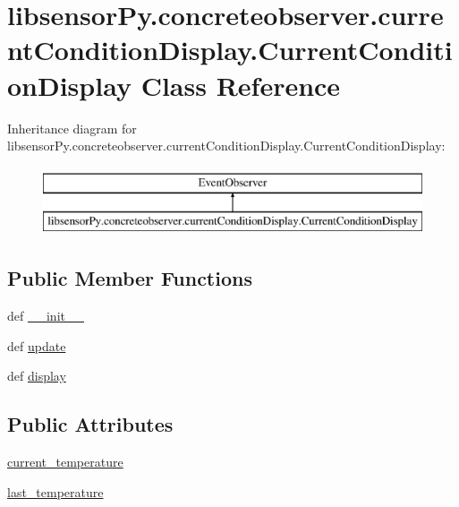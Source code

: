 \hypertarget{classlibsensorPy_1_1concreteobserver_1_1currentConditionDisplay_1_1CurrentConditionDisplay}{}\section{libsensor\+Py.\+concreteobserver.\+current\+Condition\+Display.\+Current\+Condition\+Display Class Reference}
\label{classlibsensorPy_1_1concreteobserver_1_1currentConditionDisplay_1_1CurrentConditionDisplay}
Inheritance diagram for libsensor\+Py.\+concreteobserver.\+current\+Condition\+Display.\+Current\+Condition\+Display\+:\begin{figure}[H]
\begin{center}
\leavevmode
\includegraphics[height=2.000000cm]{classlibsensorPy_1_1concreteobserver_1_1currentConditionDisplay_1_1CurrentConditionDisplay}
\end{center}
\end{figure}
\subsection*{Public Member Functions}
\begin{DoxyCompactItemize}
\item 
def \hyperlink{classlibsensorPy_1_1concreteobserver_1_1currentConditionDisplay_1_1CurrentConditionDisplay_a4d7786c94f0979069c53296a42e76028}{\+\_\+\+\_\+init\+\_\+\+\_\+}
\item 
def \hyperlink{classlibsensorPy_1_1concreteobserver_1_1currentConditionDisplay_1_1CurrentConditionDisplay_aca1a4c2470a33214c662e53379eb4145}{update}
\item 
def \hyperlink{classlibsensorPy_1_1concreteobserver_1_1currentConditionDisplay_1_1CurrentConditionDisplay_a50b0ca35d3bc8a9027fe2e2a6177723e}{display}
\end{DoxyCompactItemize}
\subsection*{Public Attributes}
\begin{DoxyCompactItemize}
\item 
\hyperlink{classlibsensorPy_1_1concreteobserver_1_1currentConditionDisplay_1_1CurrentConditionDisplay_a5caceceda5df732565a78ab2917501f3}{current\+\_\+temperature}
\item 
\hyperlink{classlibsensorPy_1_1concreteobserver_1_1currentConditionDisplay_1_1CurrentConditionDisplay_a535abe031e69dda48b4e86a2db294a7e}{last\+\_\+temperature}
\end{DoxyCompactItemize}


